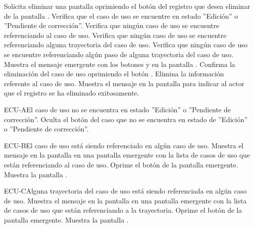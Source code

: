 	\begin{UCtrayectoria}
		\UCpaso[\UCactor] Solicita eliminar una pantalla oprimiendo el botón \eliminar del registro que desea eliminar de la pantalla .
		\UCpaso[\UCsist] Verifica que el caso de uso se encuentre en estado ''Edición'' o ''Pendiente de corrección''. 
		\UCpaso[\UCsist] Verifica que ningún caso de uso se encuentre referenciando al caso de uso. 
		\UCpaso[\UCsist] Verifica que ningún caso de uso se encuentre referenciando alguna trayectoria del caso de uso. 
		\UCpaso[\UCsist] Verifica que ningún caso de uso se encuentre referenciando algún paso de alguna trayectoria del caso de uso. 
		\UCpaso[\UCsist] Muestra el mensaje emergente  con los botones  y  en la pantalla .
		\UCpaso[\UCactor] Confirma la eliminación del caso de uso oprimiendo el botón . 
		\UCpaso[\UCsist] Elimina la información referente al caso de uso.
		\UCpaso[\UCsist] Muestra el mensaje  en la pantalla  para indicar al actor que el registro se ha eliminado exitosamente.
	\end{UCtrayectoria}		
	
	\begin{UCtrayectoriaA}{ECU-A}{El caso de uso no se encuentra en estado ''Edición'' o ''Pendiente de corrección''.}
		\UCpaso[\UCsist] Oculta el botón \eliminar del caso que no se encuentra en estado de ''Edición'' o ''Pendiente de corrección''.
	\end{UCtrayectoriaA}

	\begin{UCtrayectoriaA}{ECU-B}{El caso de uso está siendo referenciado en algún caso de uso.}
		\UCpaso[\UCsist] Muestra el mensaje  en la pantalla  en una pantalla emergente con la lista de casos de uso que están referenciando al caso de uso.
		\UCpaso[\UCactor] Oprime el botón  de la pantalla emergente.
		\UCpaso[\UCsist] Muestra la pantalla .
	\end{UCtrayectoriaA}

	\begin{UCtrayectoriaA}{ECU-C}{Alguna trayectoria del caso de uso está siendo referenciada en algún caso de uso.}
		\UCpaso[\UCsist] Muestra el mensaje  en la pantalla  en una pantalla emergente con la lista de casos de uso que están referenciando a la trayectoria.
		\UCpaso[\UCactor] Oprime el botón  de la pantalla emergente.
		\UCpaso[\UCsist] Muestra la pantalla .
	\end{UCtrayectoriaA}

